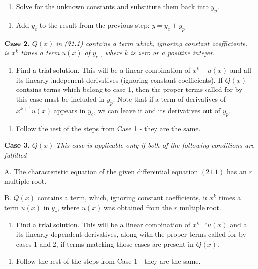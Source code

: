 \documentclass{article}
\begin{document}
\begin{enumerate}
\item Solve for the unknown constants and substitute them back into $y_p$.
\end{enumerate}

\begin{enumerate}
\item Add $y_c$ to the result from the previous step: $y = y_c + y_p$
\end{enumerate}

\textbf{Case 2.} $Q(x)$ \emph{in (21.1) contains a term which, ignoring constant coefficients, is} $x^k$ \emph{times a term} $u(x)$ \emph{of} $y_c$ \emph{, where} $k$ \emph{is zero or a positive integer}.

\begin{enumerate}
\item Find a trial solution. This will be a linear combination of $x^{k+1}u(x)$ and all its linearly indepenent derivatives (ignoring constant coefficients). If $Q(x)$ contains terms which belong to case 1, then the proper terms called for by this case must be included in $y_p$. Note that if a term of derivatives of $x^{k+1}u(x)$ appears in $y_c$, we can leave it and its derivatives out of $y_p$.
\end{enumerate}

\begin{enumerate}
\item Follow the rest of the steps from Case 1 - they are the same.
\end{enumerate}

\textbf{Case 3.} $Q(x)$ \emph{This case is applicable only if both of the following conditions are fulfilled}

A. The characteristic equation of the given differential equation $(21.1)$ has an $r$ multiple root.

B. $Q(x)$ contains a term, which, ignoring constant coefficients, is $x^k$ times a term $u(x)$ in $y_c$, where $u(x)$ was obtained from the $r$ multiple root.

\begin{enumerate}
\item Find a trial solution. This will be a linear combination of $x^{k+r}u(x)$ and all its linearly dependent derivatives, along with the proper terms called for by cases 1 and 2, if terms matching those cases are present in $Q(x)$.
\end{enumerate}

\begin{enumerate}
\item Follow the rest of the steps from Case 1 - they are the same.
\end{enumerate}
\end{document}
